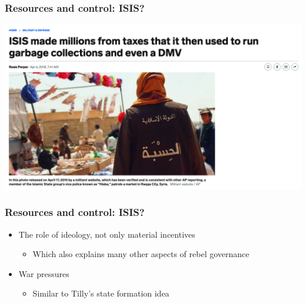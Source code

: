 \documentclass[utf8, xcolor=dvipsnames]{beamer}
\begin{document}
\begin{frame}
\frametitle{Resources and control: ISIS?}
\centering

\includegraphics[width = \textwidth]{img/isis_taxing}

\end{frame}

\begin{frame}
\frametitle{Resources and control: ISIS?}
\centering

\begin{itemize}
  \item<1-> The role of ideology, not only material incentives
  \begin{itemize}
    \item Which also explains many other aspects of rebel governance
  \end{itemize}
  \item<2-> War pressures
  \begin{itemize}
    \item Similar to Tilly's state formation idea
  \end{itemize}
  \end{itemize}

\end{frame}
\end{document}
